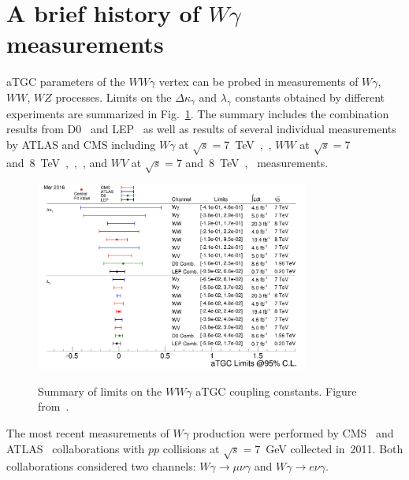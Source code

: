 \section{A brief history of $W\gamma$ measurements}


\label{sec:WgAbout_PastMeas}
aTGC parameters of the $WW\gamma$ vertex can be probed in measurements of $W\gamma$, $WW$, $WZ$ processes. Limits on the $\Delta \kappa_\gamma$ and $\lambda_\gamma$ constants obtained by different experiments are summarized in Fig.~\ref{fig:aTGC_cg}. The summary includes the combination results from D0~\cite{ref_D0_aTGC_comb} and LEP~\cite{ref_LEP_aTGC_comb} as well as results of several individual measurements by ATLAS and CMS including $W\gamma$ at $\sqrt{s}=$7~TeV~\cite{ref_7TeV_ATLAS},~\cite{ref_7TeV_CMS}, $WW$ at $\sqrt{s}=$7 and~8~TeV~\cite{ref_ATLAS_WW_8TeV},~\cite{ref_CMS_WW_7TeV},~\cite{ref_CMS_WW_8TeV}, and $WV$ at $\sqrt{s}=$7 and~8~TeV~\cite{ref_ATLAS_VW_8TeV},~\cite{ref_CMS_VW_7TeV} measurements.\\ 
\begin{figure}[htb]
  \begin{center}
    {\includegraphics[width=0.80\textwidth]{../figs/WgAbout/aTGC_cg.png}}
    \caption{Summary of limits on the $WW\gamma$ aTGC coupling constants. Figure from~\cite{ref_twiki_SMP_ATGC}.}
    \label{fig:aTGC_cg}
  \end{center}
\end{figure}
The most recent measurements of $W\gamma$ production were performed by CMS~\cite{ref_7TeV_CMS} and ATLAS~\cite{ref_7TeV_ATLAS} collaborations with $pp$ collisions at $\sqrt{s}=7$~GeV collected in~2011. Both collaborations considered two channels: $W\gamma\rightarrow\mu\nu\gamma$ and $W\gamma\rightarrow e\nu\gamma$.\\
